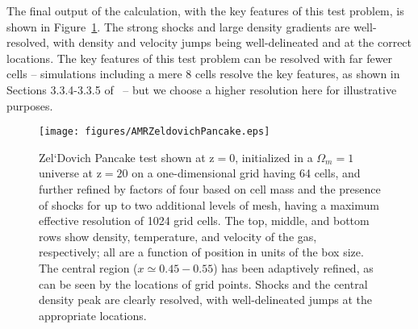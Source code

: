 The final output of the calculation, with the key features of this
test problem, is shown in Figure~\ref{fig.pancake}.
The strong shocks and large density gradients are well-resolved, with
density and velocity jumps being well-delineated and at the correct
locations.  The key features of 
this test problem can be resolved with far fewer cells -- simulations
including a mere 8 cells resolve the key features, as shown in
Sections 3.3.4-3.3.5 of~\citet{BryanThesis96} -- but we choose a
higher resolution here for illustrative purposes.

\begin{figure}
\begin{center}
\texttt{[image: figures/AMRZeldovichPancake.eps]}
\caption{Zel`Dovich Pancake test shown at z$ = 0$, initialized in a
$\Omega_m = 1$ universe at z$ = 20$ on a one-dimensional grid having
64 cells, and further refined by factors of four based on cell mass
and the presence of shocks for up to two additional levels of mesh,
having a maximum effective resolution of 1024 grid cells. The top,
middle, and bottom rows show density, temperature, and velocity of the
gas, respectively; all are a function of position in units of the box
size.  The central region ($x \simeq 0.45-0.55$) has been adaptively
refined, as can be seen by the locations of grid points.  Shocks and
the central density peak are clearly resolved, with well-delineated
jumps at the appropriate locations.}
\label{fig.pancake}
\end{center}
\end{figure}
